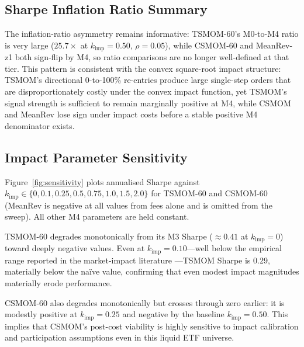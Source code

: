 \documentclass[12pt]{article}
\newcommand{\kimp}{k_{\mathrm{imp}}}
\begin{document}
\subsection{Sharpe Inflation Ratio Summary}

\begin{table}[H]
\centering
\caption{Sharpe inflation ratios ($b = 20$ primary). IR $=
\hat S_{M0}/\hat S_{Mk}$, defined only when both Sharpes share
positive sign. MeanRev rows are sign-flipped from M1.}
\label{tab:inflation}
\small

\end{table}

The inflation-ratio asymmetry remains informative: TSMOM-60's
M0-to-M4 ratio is very large ($25.7\times$ at $\kimp=0.50$, $\rho=0.05$), while CSMOM-60 and
MeanRev-z1 both sign-flip by M4, so ratio comparisons are no longer
well-defined at that tier. This pattern is consistent with the convex square-root impact structure:
TSMOM's directional 0-to-100\% re-entries produce large single-step
orders that are disproportionately costly under the convex impact
function, yet TSMOM's signal strength is sufficient to remain marginally
positive at M4, while CSMOM and MeanRev lose sign under impact costs
before a stable positive M4 denominator exists.

\subsection{Impact Parameter Sensitivity}
\label{sec:sensitivity}

Figure~\ref{fig:sensitivity} plots annualised Sharpe against
$\kimp \in \{0, 0.1, 0.25, 0.5, 0.75, 1.0, 1.5, 2.0\}$ for TSMOM-60
and CSMOM-60 (MeanRev is negative at all values from fees alone and
is omitted from the sweep). All other M4 parameters are held constant.

TSMOM-60 degrades monotonically from its M3 Sharpe ($\approx 0.41$ at
$\kimp = 0$) toward deeply negative values. Even at $\kimp = 0.10$---well
below the empirical range reported in the market-impact
literature \citep{lillo2003master}---TSMOM Sharpe
is 0.29, materially below the na\"{i}ve value, confirming that even
modest impact magnitudes materially erode performance.

CSMOM-60 also degrades monotonically but crosses through zero earlier:
it is modestly positive at $\kimp = 0.25$ and negative by the baseline
$\kimp = 0.50$. This implies that CSMOM's post-cost viability is highly
sensitive to impact calibration and participation assumptions even in this
liquid ETF universe.
\end{document}
